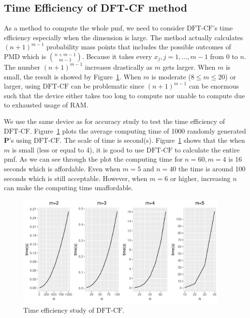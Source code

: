 \documentclass[12pt]{article}
\newcommand{\Pmat}{\mathbf{P}}
\newcommand{\PMD}{\textrm{PMD}}
\newcommand{\dft}{{\textrm{DFT-CF}}}
\begin{document}
\subsection{Time Efficiency of DFT-CF method}
As a method to compute the whole pmf, we need to consider $\dft$'s time efficiency especially when the dimension is large. The method actually calculates $(n+1)^{m-1}$ probability mass points that includes the possible outcomes of $\PMD$ which is $\binom{n+m-1}{m-1}$. Because it takes every $x_j,j=1,\dots,m-1$ from 0 to $n$. The number $(n+1)^{m-1}$ increases drastically as $m$ gets larger. When $m$ is small, the result is showed by Figure~\ref{fig:time.eff}. When $m$ is moderate ($8 \leq m \leq 20$) or larger, using $\dft$ can be problematic since $(n+1)^{m-1}$ can be enormous such that the device either takes too long to compute nor unable to compute due to exhausted usage of RAM.

We use the same device as for accuracy study to test the time efficiency of $\dft$. Figure~\ref{fig:time.eff} plots the average computing time of 1000 randomly generated $\Pmat$'s using $\dft$. The scale of time is second(s). Figure~\ref{fig:time.eff} shows that the when $m$ is small (less or equal to 4), it is good to use $\dft$ to calculate the entire pmf. As we can see through the plot the computing time for $n=60, m=4$ is 16 seconds which is affordable. Even when $m=5$ and $n=40$ the time is around 100 seconds which is still acceptable. However, when $m=6$ or higher, increasing $n$ can make the computing time unaffordable.


\begin{figure}%
\begin{center}
	\includegraphics[width=0.95\textwidth]{figures/effi.pdf}
	\caption{Time efficiency study of $\dft$.}
	\label{fig:time.eff}
\end{center}
\end{figure}
\end{document}
